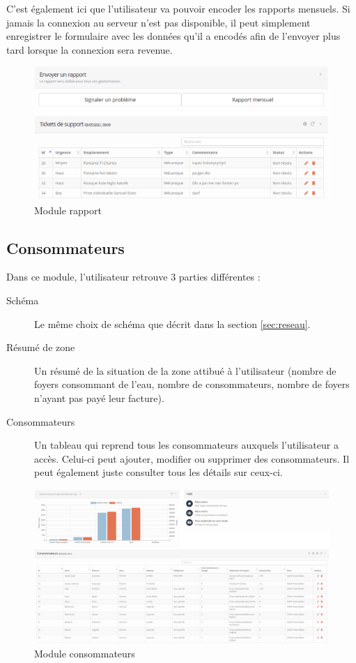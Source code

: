 \documentclass{EPL-master-thesis-covers-FR}
\begin{document}
				C'est également ici que l'utilisateur va pouvoir encoder les rapports mensuels. Si jamais la connexion au serveur n'est pas disponible, il peut simplement enregistrer le formulaire avec les données qu'il a encodés afin de l'envoyer plus tard lorsque la connexion sera revenue.
				
				\begin{figure}[H]
					\centering
					\includegraphics[width=1\textwidth]{images/report}
					\caption{Module rapport}
				\end{figure}
			
			\subsection{Consommateurs}
				Dans ce module, l'utilisateur retrouve 3 parties différentes :
				\begin{description}
					\item[Schéma] Le même choix de schéma que décrit dans la section \ref{sec:reseau}.
					\item[Résumé de zone] Un résumé de la situation  de la zone attibué à l'utilisateur (nombre de foyers consommant de l'eau, nombre de consommateurs, nombre de foyers n'ayant pas payé leur facture).
					\item[Consommateurs] Un tableau qui reprend tous les consommateurs auxquels l'utilisateur a accès. Celui-ci peut ajouter, modifier ou supprimer des consommateurs. Il peut également juste consulter tous les détails sur ceux-ci.
				\end{description}

				
				\begin{figure}[H]
					\centering
					\includegraphics[width=1\textwidth]{images/consumer}
					\caption{Module consommateurs}
				\end{figure}
				
\end{document}
